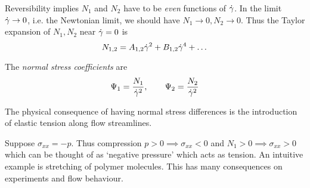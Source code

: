 \documentclass{jknotes}
\begin{document}
Reversibility implies $N_1$ and $N_2$ have to be \emph{even} functions of
$\dot{\gamma}$. In the limit $\dot{\gamma} \to 0$, i.e. the Newtonian limit,
we should have $N_1 \to 0, N_2 \to 0$. Thus the Taylor expansion of $N_1, N_2$
near $\dot{\gamma} = 0$ is
\begin{equation}
	N_{1,2} = A_{1,2}\dot{\gamma}^2 + B_{1,2}\dot{\gamma}^4 + \dots
\end{equation}

\begin{defn}
	The \emph{normal stress coefficients} are
	\begin{equation}
		\Psi_1 = \frac{N_1}{\dot{\gamma}^2}, \hspace{2em} \Psi_2 =
		\frac{N_2}{\dot{\gamma}^2}
	\end{equation}
\end{defn}

The physical consequence of having normal stress differences is the
introduction of elastic tension along flow streamlines.

Suppose $\sigma_{xx} = -p$. Thus compression $p > 0 \implies \sigma_{xx} < 0$
and $N_1 > 0 \implies \sigma_{xx} > 0$ which can be thought of as `negative
pressure' which acts as tension. An intuitive example is stretching of polymer
molecules. This has many consequences on experiments and flow behaviour.
\end{document}
